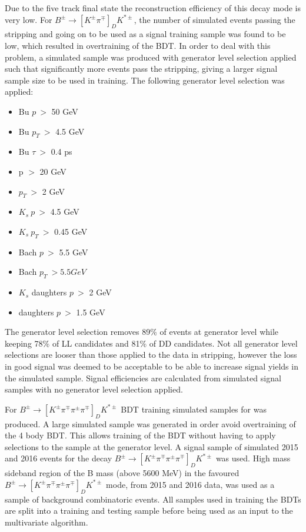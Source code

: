 Due to the five track final state the reconstruction efficiency of this decay mode is very low. For $B^{\pm} \to [K^{\pm}\pi^{\mp}]_D K^{*\pm}$, the number of simulated events passing the stripping and going on to be used as a signal training sample was found to be low, which resulted in overtraining of the BDT. In order to deal with this problem, a simulated sample was produced with generator level selection applied such that significantly more events pass the stripping, giving a larger signal sample size to be used in training. The following generator level selection was applied:

\begin{itemize}
\item{Bu $p\ >$ 50 GeV}
\item{Bu $p_T\ >$ 4.5 GeV}
\item{Bu $\tau\ >$ 0.4 ps}
\item{\Dz p $>$ 20 GeV}
\item{\Dz $p_T\ >$ 2 GeV}
\item{$K_s\ p\ >$ 4.5 GeV}
\item{$K_s\ p_T\ >$ 0.45 GeV}
\item{Bach $p\ >$ 5.5 GeV}
\item{Bach $p_T\ > 5.5 GeV$}
\item{$K_s$ daughters $p\ >$ 2 GeV}
\item{\Dz daughters $p\ >$ 1.5 GeV}
\end{itemize}

The generator level selection removes 89\% of events at generator level while keeping 78\% of LL candidates and 81\% of DD candidates. Not all generator level selections are looser than those applied to the data in stripping, however the loss in good signal was deemed to be acceptable to be able to increase signal yields in the simulated sample. Signal efficiencies are calculated from simulated signal samples with no generator level selection applied.

For $B^{\pm} \to [K^{\pm}\pi^{\mp}\pi^{\pm}\pi^{\mp}]_D K^{*\pm}$ BDT training simulated samples for \runtwo was produced. A large \runtwo simulated sample was generated in order avoid overtraining of the 4 body BDT. This allows training of the BDT without having to apply selections to the sample at the generator level. A signal sample of simulated 2015 and 2016 events for the decay $B^{\pm} \to [K^{\pm}\pi^{\mp}\pi^{\pm}\pi^{\mp}]_D K^{*\pm}$ was used. High mass sideband region of the B mass (above 5600 MeV) in the favoured $B^{\pm} \to [K^{\pm}\pi^{\mp}\pi^{\pm}\pi^{\mp}]_D K^{*\pm}$ mode, from 2015 and 2016 data, was used as a sample of background combinatoric events. All samples used in training the BDTs are split into a training and testing sample before being used as an input to the multivariate algorithm.

